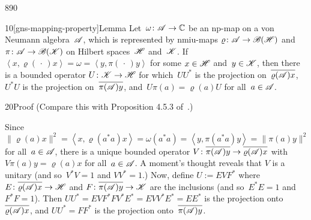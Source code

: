 \begin{parsec}{890}%
\begin{point}{10}[gns-mapping-property]{Lemma}%
Let~$\omega\colon \mathscr{A}\to\mathbb{C}$
be an np-map on a von Neumann algebra~$\mathscr{A}$,
which is represented by nmiu-maps
$\varrho\colon \mathscr{A}\to\mathscr{B}(\mathscr{H})$
and $\pi\colon \mathscr{A}\to\mathscr{B}(\mathscr{K})$
on Hilbert spaces~$\mathscr{H}$ and~$\mathscr{K}$.
If $\left<x,\varrho(\,\cdot\,)x\right>
=\omega=\left<y,\pi(\,\cdot\,)y\right>$
for some  $x\in\mathscr{H}$ and~$y\in\mathscr{K}$,
then there is a bounded operator $U\colon \mathscr{K}\to\mathscr{H}$
for which~$UU^*$ is the projection
on~$\overline{\varrho(\mathscr{A})x}$,
$U^*U$ is the projection
on~$\overline{\pi(\mathscr{A})y}$,
and~$U\pi(a)=\varrho(a)U$
for all~$a\in\mathscr{A}$.
\begin{point}{20}{Proof}%
(Compare this with Proposition 4.5.3 of~\cite{kr}.)

Since $\|\varrho(a)x\|^2
= \left<x,\varrho(a^*a)x\right>
=\omega(a^*a)=\left<y,\pi(a^*a)y\right>
= \|\pi(a)y\|^2$ for all~$a\in\mathscr{A}$,
there is a unique bounded operator $V\colon \overline{\pi(\mathscr{A})y}
\to \overline{\varrho(\mathscr{A})x}$
with $V\pi(a)y = \varrho(a)x$ for all~$a\in\mathscr{A}$.
A moment's thought reveals
	that $V$ is a unitary (and so~$V^*V=1$ and $VV^*=1$.)
Now, define $U:=EVF^*$
where $E\colon \overline{\varrho(\mathscr{A})x}\to\mathscr{H}$
and $F\colon \overline{\pi(\mathscr{A})y}\to\mathscr{K}$
are the inclusions
(and so~$E^*E=1$ and~$F^*F=1$).
Then $UU^*= EVF^*FV^*E^*=EVV^*E^*=EE^*$
is the projection onto~$\overline{\varrho(\mathscr{A})x}$,
and $UU^*=FF^*$
is the projection onto~$\overline{\pi(\mathscr{A})y}$.


\end{point}
\end{point}
\end{parsec}
